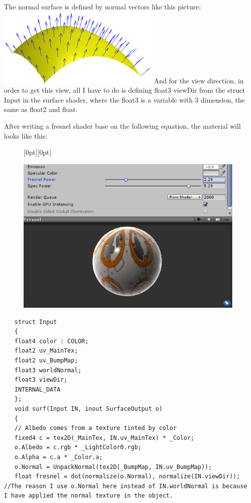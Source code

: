 \documentclass[a4paper, 13pt]{extarticle}
\begin{document}
{   The normal surface is defined by normal vectors like this picture: \includegraphics[width=0.3\linewidth]{Surface_normal.png}
   And for the view direction, in order to get this view, all I have to do is defining float3 viewDir from the struct Input in the surface shader, where the float3 is a variable with 3 dimension, the same as float2 and float. 
   
   After writing a fresnel shader base on the following equation, the material will looks like this:
    \begin{figure}[h]
    	\raisebox{-21mm}[0pt][0pt]{
    	\begin{minipage}{.4\textwidth}
    		\centering
    		\includegraphics[width=1\linewidth]{intructions/fresnel_effect.png}
    		\centering
    	\end{minipage}
    }
    \end{figure}
\newpage
   \begin{lstlisting}
   struct Input
   {
   float4 color : COLOR;
   float2 uv_MainTex;
   float2 uv_BumpMap;
   float3 worldNormal;
   float3 viewDir;
   INTERNAL_DATA
   };   
   void surf(Input IN, inout SurfaceOutput o)
   {
   // Albedo comes from a texture tinted by color
   fixed4 c = tex2D(_MainTex, IN.uv_MainTex) * _Color;
   o.Albedo = c.rgb * _LightColor0.rgb;
   o.Alpha = c.a * _Color.a;
   o.Normal = UnpackNormal(tex2D(_BumpMap, IN.uv_BumpMap));
   float fresnel = dot(normalize(o.Normal), normalize(IN.viewDir)); //The reason I use o.Normal here instead of IN.worldNormal is because I have applied the normal texture in the object.

\end{lstlisting}}
\end{document}
